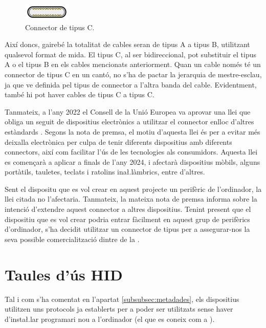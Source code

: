 \begin{figure}[ht]
    \centering
    \includegraphics[width=0.2\textwidth]{images/usb_c.png}
    \caption{Connector  de tipus C. \cite{Contributors2024USB}}
    \label{fig:usb_connectors_c}
\end{figure}

Així doncs, gairebé la totalitat de cables  seran de tipus A a tipus
B, utilitzant qualsevol format de mida. El tipus C, al ser bidireccional, pot
substituir el tipus A o el tipus B en els cables mencionats anteriorment.
Quan un cable només té un connector de tipus C en un cantó, no s'ha de pactar
la jerarquia de mestre-esclau, ja que ve definida pel tipus de connector a
l'altra banda del cable. Evidentment, també hi pot haver cables de tipus C a
tipus C.

Tanmateix, a l'any 2022 el Consell de la Unió Europea va aprovar una llei
que obliga un seguit de dispositius electrònics a utilitzar el connector
 enlloc d'altres estàndards \cite{Council2022Common}. Segons la
nota de premsa, el motiu d'aquesta llei és per a evitar més deixalla electrònica
per culpa de tenir diferents dispositius amb diferents connectors, així com
facilitar l'ús de les tecnologies als consumidors. Aquesta llei
es començarà a aplicar a finals de l'any 2024, i afectarà dispositius mòbils, 
alguns portàtils, tauletes, teclats i ratolins ina\l.làmbrics, entre
d'altres.

Sent el dispositu que es vol crear en aquest projecte un perifèric de
l'ordinador, la llei citada no l'afectaria. Tanmateix, la mateixa nota de premsa
informa sobre la intenció d'extendre aquest connector a altres dispositius.
Tenint present que el dispositiu que es vol crear podria entrar fàcilment en
aquest grup de perifèrics d'ordinador, s'ha decidit utilitzar un connector de
tipus  per a assegurar-nos la seva possible comercialització dintre
de la .

\section{Taules d'ús HID}
\label{sec:hut}

Tal i com s'ha comentat en l'apartat \ref{subsubsec:metadades}, els dispositius
 utilitzen uns protocols ja establerts per a poder ser utilitzats
sense haver d'insta\l.lar programari nou a l'ordinador (el que es coneix com
a ).

